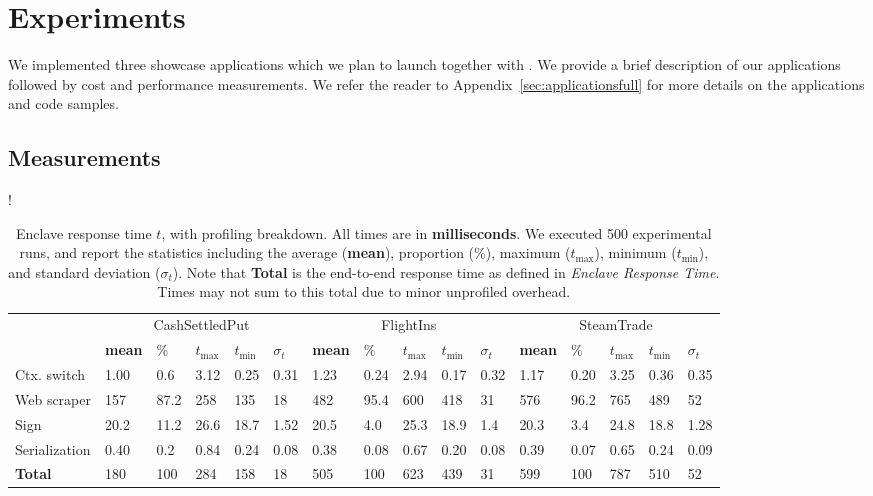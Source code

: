 \section{Experiments}
\label{sec:experiments}

We implemented three showcase applications which we plan to launch together with \tc.
We provide a brief description of our applications followed by cost and performance measurements.
We refer the reader to Appendix~\ref{sec:applicationsfull} for more details on the applications and code samples.



\subsection{Measurements}

\begin{table*}
\resizebox{\linewidth} {!}{
\begin{tabular}{l|lllll|lllll|lllll}
\toprule
& \multicolumn{5}{c|}{\sf CashSettledPut} &
  \multicolumn{5}{c|}{\sf FlightIns} &
  \multicolumn{5}{c}{\sf SteamTrade} \\
    & \textbf{mean} & \% & $t_{\max}$ & $t_{\min}$ & $\sigma_t$ & \textbf{mean}
    & \% & $t_{\max}$ & $t_{\min}$ & $\sigma_t$ & \textbf{mean} & \% & $t_{\max}$
    & $t_{\min}$ & $\sigma_t$\\
\midrule
    Ctx. switch & 1.00 & 0.6 & 3.12 & 0.25 & 0.31 
                & 1.23 & 0.24 & 2.94 & 0.17 & 0.32 
                & 1.17 & 0.20 & 3.25 & 0.36 & 0.35\\
    Web scraper & 157  & 87.2 & 258 & 135 & 18 
                & 482  & 95.4 & 600 & 418 & 31 
                & 576  & 96.2 & 765 & 489 & 52\\
    Sign        & 20.2 & 11.2 & 26.6 & 18.7 & 1.52 
                & 20.5 & 4.0 & 25.3 & 18.9 & 1.4 
                & 20.3 & 3.4 & 24.8 & 18.8 & 1.28\\
    Serialization 
                & 0.40 & 0.2 & 0.84 & 0.24 & 0.08 
                & 0.38 & 0.08 & 0.67 & 0.20 & 0.08 
                & 0.39 & 0.07 & 0.65 & 0.24 & 0.09\\
\midrule
\midrule
    \textbf{Total} 
                & 180 & 100 & 284 & 158 & 18 
                & 505 & 100 & 623 & 439 & 31 
                & 599 & 100 & 787 & 510 & 52 \\
\bottomrule
\end{tabular}
}
\caption{Enclave response time $t$, with profiling breakdown. All times are in {\bf milliseconds}.
We executed 500 experimental runs, and report
the statistics including 
the average ({\bf mean}), proportion (\%), maximum ($t_{\max}$),
minimum ($t_{\min}$), and standard deviation ($\sigma_t$). Note that {\bf Total} is the end-to-end response time as 
defined in \emph{Enclave Response Time}. Times may not
sum to this total due to minor unprofiled overhead.}
\label{tab:eval_profiling}
\vspace{-1em}
\end{table*}

